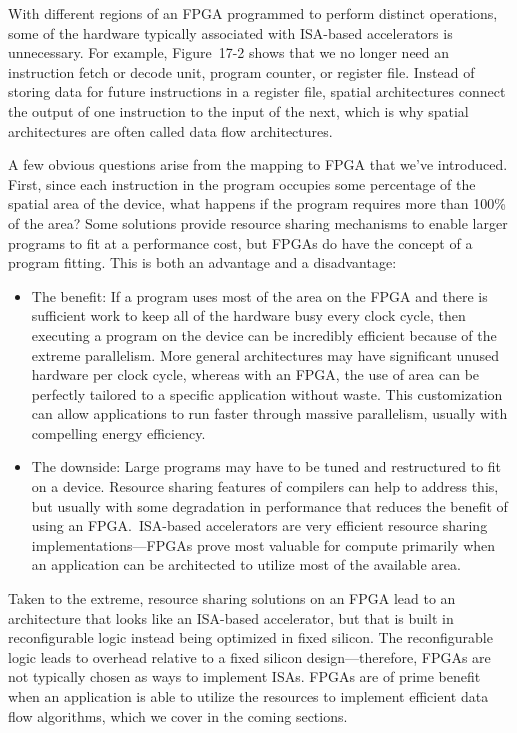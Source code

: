 With different regions of an FPGA programmed to perform distinct operations, some of the hardware typically associated with ISA-based accelerators is unnecessary. For example, Figure 17-2 shows that we no longer need an instruction fetch or decode unit, program counter, or register file. Instead of storing data for future instructions in a register file, spatial architectures connect the output of one instruction to the input of the next, which is why spatial architectures are often called data flow architectures.\par

A few obvious questions arise from the mapping to FPGA that we’ve introduced. First, since each instruction in the program occupies some percentage of the spatial area of the device, what happens if the program requires more than 100\% of the area? Some solutions provide resource sharing mechanisms to enable larger programs to fit at a performance cost, but FPGAs do have the concept of a program fitting. This is both an advantage and a disadvantage:\par

\begin{itemize}
	\item The benefit: If a program uses most of the area on the FPGA and there is sufficient work to keep all of the hardware busy every clock cycle, then executing a program on the device can be incredibly efficient because of the extreme parallelism. More general architectures may have significant unused hardware per clock cycle, whereas with an FPGA, the use of area can be perfectly tailored to a specific application without waste. This customization can allow applications to run faster through massive parallelism, usually with compelling energy efficiency.
	\item The downside: Large programs may have to be tuned and restructured to fit on a device. Resource sharing features of compilers can help to address this, but usually with some degradation in performance that reduces the benefit of using an FPGA. ISA-based accelerators are very efficient resource sharing implementations—FPGAs prove most valuable for compute primarily when an application can be architected to utilize most of the available area.
\end{itemize}

Taken to the extreme, resource sharing solutions on an FPGA lead to an architecture that looks like an ISA-based accelerator, but that is built in reconfigurable logic instead being optimized in fixed silicon. The reconfigurable logic leads to overhead relative to a fixed silicon design—therefore, FPGAs are not typically chosen as ways to implement ISAs. FPGAs are of prime benefit when an application is able to utilize the resources to implement efficient data flow algorithms, which we cover in the coming sections.\par

